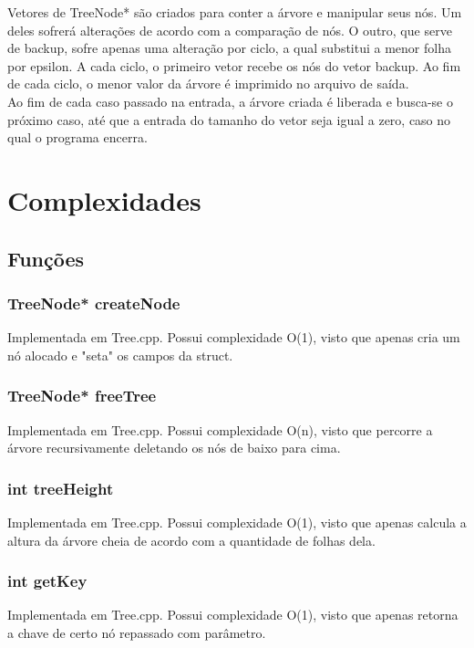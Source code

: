 \documentclass[a4paper,12pt]{article}
\begin{document}
        Vetores de TreeNode* são criados para conter a árvore e manipular seus nós. Um deles sofrerá alterações de acordo com a comparação de nós. O outro, que serve de backup, sofre apenas uma alteração por ciclo, a qual substitui a menor folha por epsilon. A cada ciclo, o primeiro vetor recebe os nós do vetor backup. Ao fim de cada ciclo, o menor valor da árvore é imprimido no arquivo de saída.
        \\
        
        Ao fim de cada caso passado na entrada, a árvore criada é liberada e busca-se o próximo caso, até que a entrada do tamanho do vetor seja igual a zero, caso no qual o programa encerra.
    
\section{Complexidades}

    \subsection{Funções}
    
        \subsubsection{TreeNode* createNode}
            Implementada em Tree.cpp. Possui complexidade O(1), visto que apenas cria um nó alocado e "seta" os campos da struct. 
        
        \subsubsection{TreeNode* freeTree}
            Implementada em Tree.cpp. Possui complexidade O(n), visto que percorre a árvore recursivamente deletando os nós de baixo para cima.
            
        \subsubsection{int treeHeight}
            Implementada em Tree.cpp. Possui complexidade O(1), visto que apenas calcula a altura da árvore cheia de acordo com a quantidade de folhas dela.
            
        \subsubsection{int getKey}
            Implementada em Tree.cpp. Possui complexidade O(1), visto que apenas retorna a chave de certo nó repassado com parâmetro.
            
\end{document}
